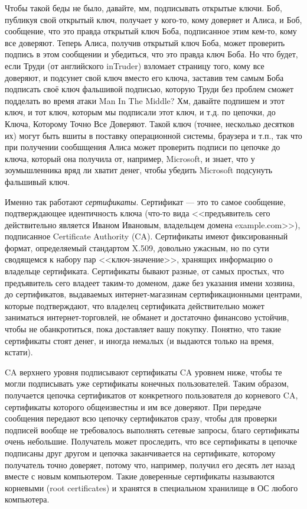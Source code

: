\documentclass[a5paper]{article}
\begin{document}
Чтобы такой беды не было, давайте, мм, подписывать открытые ключи. Боб, публикуя свой открытый ключ, получает у кого-то, кому доверяет и Алиса, и Боб, сообщение, что это правда открытый ключ Боба, подписанное этим кем-то, кому все доверяют. Теперь Алиса, получив открытый ключ Боба, может проверить подпись в этом сообщении и убедиться, что это правда ключ Боба. Но что будет, если Труди (от английского inTruder) взломает страницу того, кому все доверяют, и подсунет свой ключ вместо его ключа, заставив тем самым Боба подписать своё ключ фальшивой подписью, которую Труди без проблем сможет подделать во время атаки Man In The Middle? Хм, давайте подпишем и этот ключ, и тот ключ, которым мы подписали этот ключ, и т.д. по цепочки, до Ключа, Которому Точно Все Доверяют. Такой ключ (точнее, несколько десятков их) могут быть вшиты в поставку операционной системы, браузера и т.п., так что при получении сообшщения Алиса может проверить подписи по цепочке до ключа, который она получила от, например, Microsoft, и знает, что у зоумышленника вряд ли хватит денег, чтобы убедить Microsoft подсунуть фальшивый ключ.

Именно так работают \textit{сертификаты}. Сертификат --- это то самое сообщение, подтверждающее идентичность ключа (что-то вида <<предъявитель сего действительно является Иваном Ивановым, владельцем домена example.com>>), подписанное Certificate Authority (CA). Сертификаты имеют фиксированный формат, определяемый стандартом X.509, довольно ужасным, но по сути сводящемся к набору пар <<ключ-значение>>, хранящих информацию о владельце сертификата. Сертификаты бывают разные, от самых простых, что предъявитель сего владеет таким-то доменом, даже без указания имени хозяина, до сертификатов, выдаваемых интернет-магазинам сертификационными центрами, которые подтверждают, что владелец сертификата действительно может заниматься интернет-торговлей, не обманет и достаточно финансово устойчив, чтобы не обанкротиться, пока доставляет вашу покупку.  Понятно, что такие сертификаты стоят денег, и иногда немалых (и выдаются только на время, кстати).

CA верхнего уровня подписывают сертификаты CA уровнем ниже, чтобы те могли подписывать уже сертификаты конечных пользователей. Таким образом, получается цепочка сертификатов от конкретного пользователя до корневого CA, сертификаты которого общеизвестны и им все доверяют. При передаче сообщения передают всю цепочку сертификатов сразу, чтобы для проверки подписей вообще не требовалось выполнять сетевые запросы, благо сертификаты очень небольшие. Получатель может проследить, что все сертификаты в цепочке подписаны друг другом и цепочка заканчивается на сертификате, которому получатель точно доверяет, потому что, например, получил его десять лет назад вместе с новым компьютером. Такие доверенные сертификаты называются корневыми (root certificates) и хранятся в специальном хранилище в ОС любого компьютера.
\end{document}

